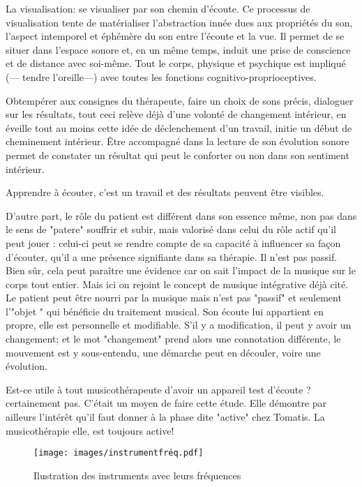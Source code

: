 La visualisation: se visualiser par son chemin d'écoute.  
Ce processus de visualisation tente de matérialiser l'abstraction innée dues aux propriétés du son, l'aspect intemporel et éphémère du son entre l'écoute et la vue.
Il permet de se situer dans l'espace sonore et, en un même temps, induit une prise de conscience et de distance avec soi-même. Tout le corps, physique et psychique est impliqué (--- tendre l'oreille---) avec toutes les fonctions cognitivo-proprioceptives.


Obtempérer aux consignes du thérapeute, faire un choix de sons précis, dialoguer sur les résultats, tout ceci relève déjà d'une volonté de changement intérieur, en  éveille tout au moins cette idée de déclenchement d'un travail, initie un début de cheminement intérieur.
Être accompagné dans la lecture de son évolution sonore permet de constater un résultat qui  peut le conforter ou non dans son sentiment intérieur.



Apprendre à écouter, c'est un travail et des résultats peuvent être
visibles. 

	
	D'autre part, le rôle du patient est différent dans son essence même, non pas dans le sens de "patere" souffrir et subir, mais valorisé dans celui du rôle actif qu'il peut jouer : celui-ci peut se rendre compte de sa capacité à influencer sa façon d'écouter, qu'il a une présence signifiante dans sa thérapie.  Il n'est pas passif. Bien sûr, cela peut paraître une évidence car on sait l'impact de la musique sur le corps tout entier. Mais ici on rejoint  le concept de musique intégrative déjà cité\autocite[Cf.]{vrait_musicotherapie_2018}. Le patient peut être nourri par la musique mais n'est pas "passif" et seulement l'"objet " qui bénéficie du traitement musical. Son  écoute lui appartient en propre, elle est personnelle et modifiable. S'il y a modification, il peut y avoir un changement; et le mot "changement" prend alors une connotation différente,  le mouvement est y  sous-entendu,  une démarche peut en découler, voire une évolution. 



        Est-ce utile à tout musicothérapeute d'avoir un appareil test d'écoute ? certainement pas. C'était un moyen de faire cette étude. Elle démontre par ailleurs l'intérêt qu'il faut donner à la phase dite "active" chez Tomatis. La musicothérapie elle, est toujours active!
        
      \begin{figure}
	\centering
	\texttt{[image: images/instrumentfréq.pdf]}
	\caption[Les instruments et leurs fréquences]{Ilustration des instruments avec leurs fréquences}
       
	\label{instrumentfreq}
\end{figure}
  
